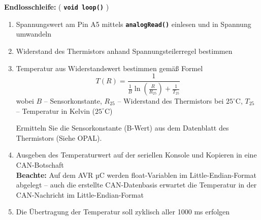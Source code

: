 \documentclass[
    fontsize=12pt,                      %
    paper=a4,                           %
    twoside=off,                       %
    DIV=15,                             %
    BCOR=12mm,                          %
    headings=normal,                    %
    headsepline=false,                   %
    footsepline=false,                  %
    headinclude=true,                   %
    footinclude=false,                  %
    toc=listof,                         %
    toc=bib,                            %
    chapterprefix=false,                %
    appendixprefix=false,               %
    numbers=noendperiod,                %
    captions=tableabove,                %
    footnotes=multiple,                 %
    bibliography=oldstyle,              %
    draft=false,                        %
]{scrreprt}
\newcommand{\Farbcode}[1]{\texttt{\textbf{\textcolor{myred}{#1}}}}
\begin{document}
\noindent
\textbf{Endlosschleife:} ( \Farbcode{void loop()} )
\begin{enumerate}
\item Spannungswert am Pin A5 mittels \Farbcode{analogRead()} einlesen und in Spannung umwandeln
\item Widerstand des Thermistors anhand Spannungsteilerregel bestimmen
\item Temperatur aus Widerstandswert bestimmen gemäß Formel
\begin{equation*}
T(R)=\frac{1}{\frac{1}{B}\ln(\frac{R}{R_{25}})+\frac{1}{T_{25}}} 
\end{equation*}
wobei $B$ -- Sensorkonstante, $R_{25}$ -- Widerstand des Thermistors bei $25^\circ$C, $T_{25}$ -- Temperatur in Kelvin ($25^\circ$C)

Ermitteln Sie die Sensorkonstante (B-Wert) aus dem Datenblatt des Thermistors (Siehe OPAL).
\item Ausgeben des Temperaturwert auf der seriellen Konsole und Kopieren in eine CAN-Botschaft \\
\textbf{Beachte:} Auf dem AVR µC werden float-Variablen im Little-Endian-Format abgelegt -- auch die erstellte CAN-Datenbasis erwartet die Temperatur in der CAN-Nachricht im Little-Endian-Format

\item Die Übertragung der Temperatur soll zyklisch aller 1000 ms erfolgen
\end{enumerate}
\newpage
\end{document}
